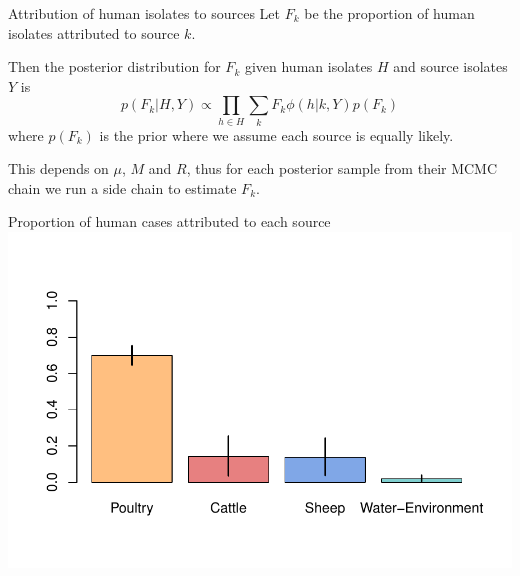\documentclass[]{beamer}
\begin{document}
\begin{frame}{Attribution of human isolates to sources}
Let $F_{k}$ be the proportion of human isolates attributed to source $k$.

Then the posterior distribution for $F_k$ given human isolates $H$ and source isolates $Y$ is
\[
p(F_k| H, Y) \propto \prod_{h\in H} \sum_k F_k\phi(h|k,Y) p(F_k)
\]
where $p(F_k)$ is the prior where we assume each source is equally likely.

This depends on $\mu$, $M$ and $R$, thus for each posterior sample from their MCMC chain we run a side chain to estimate $F_k$.
\end{frame}

\begin{frame}{Proportion of human cases attributed to each source}
\includegraphics[width=\textwidth, trim=40 0 40 0]{Pictures/island/overall_prop.pdf}
\end{frame}
\end{document}
